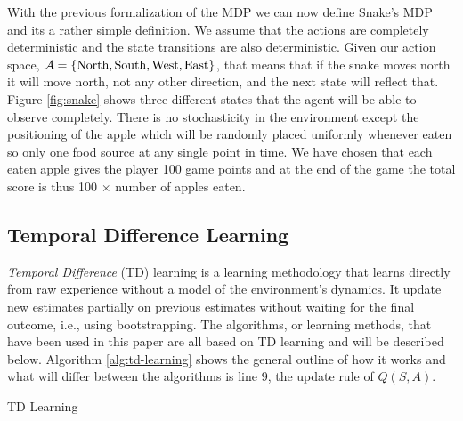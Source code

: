 \documentclass[result.tex]{subfiles}
\begin{document}
    With the previous formalization of the MDP we can now define Snake's MDP and its a rather simple definition. We assume that the actions are completely deterministic and the state transitions are also deterministic. Given our action space, $\mathcal{A} = \{ \text{North}, \text{South}, \text{West}, \text{East} \}$, that means that if the snake moves north it will move north, not any other direction, and the next state will reflect that. Figure \ref{fig:snake} shows three different states that the agent will be able to observe completely. There is no stochasticity in the environment except the positioning of the apple which will be randomly placed uniformly whenever eaten so only one food source at any single point in time. We have chosen that each eaten apple gives the player 100 game points and at the end of the game the total score is thus 100 $\times$ number of apples eaten.

    \subsection*{Temporal Difference Learning}

    \textit{Temporal Difference} (TD) learning is a learning methodology that learns directly from raw experience without a model of the environment's dynamics. It update new estimates partially on previous estimates without waiting for the final outcome, i.e., using bootstrapping. The algorithms, or learning methods, that have been used in this paper are all based on TD learning and will be described below. Algorithm \ref{alg:td-learning} shows the general outline of how it works and what will differ between the algorithms is line 9, the update rule of $Q(S, A)$.

    \begin{algorithm}[H]
        \caption{TD Learning}
        \label{alg:td-learning}
        \begin{algorithmic}[1]
            \Statex


            \EndWhile
            \EndFor
            \State
            \EndFunction
        \end{algorithmic}
    \end{algorithm}
\end{document}
